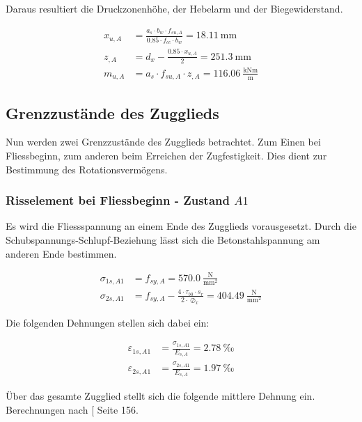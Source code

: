 \documentclass[
  11pt,
  letterpaper,
]{scrreprt}
\begin{document}
Daraus resultiert die Druckzonenhöhe, der Hebelarm und der
Biegewiderstand.

\[
\begin{aligned}
x_{u , A}& = \frac{a_{s} \cdot b_{w} \cdot f_{su , A}}{0.85 \cdot f_{cc} \cdot b_{w}} = 18.11 \ \mathrm{mm} \\ 
z_{, A}& = d_{x} - \frac{0.85 \cdot x_{u , A}}{2} = 251.3 \ \mathrm{mm} \\ 
m_{u , A}& = a_{s} \cdot f_{su , A} \cdot z_{, A} = 116.06 \ \frac{\mathrm{kNm}}{\mathrm{m}} \end{aligned}
\]

\subsection{Grenzzustände des
Zugglieds}\label{grenzzustuxe4nde-des-zugglieds}

Nun werden zwei Grenzzustände des Zugglieds betrachtet. Zum Einen bei
Fliessbeginn, zum anderen beim Erreichen der Zugfestigkeit. Dies dient
zur Bestimmung des Rotationsvermögens.

\subsubsection{\texorpdfstring{Risselement bei Fliessbeginn - Zustand
\(A1\)}{Risselement bei Fliessbeginn - Zustand A1}}\label{risselement-bei-fliessbeginn---zustand-a1}

Es wird die Fliessspannung an einem Ende des Zugglieds vorausgesetzt.
Durch die Schubspannungs-Schlupf-Beziehung lässt sich die
Betonstahlspannung am anderen Ende bestimmen.

\[
\begin{aligned}
\sigma_{1 s , A1}& = f_{sy , A} = 570.0 \ \frac{\mathrm{N}}{\mathrm{mm}^{2}} \\ 
\sigma_{2 s , A1}& = f_{sy , A} - \frac{4 \cdot \tau_{b0} \cdot s_{r}}{2 \cdot \oslash_{x}} = 404.49 \ \frac{\mathrm{N}}{\mathrm{mm}^{2}} \end{aligned}
\]

Die folgenden Dehnungen stellen sich dabei ein:

\[
\begin{aligned}
\varepsilon_{1 s , A1}& = \frac{\sigma_{1 s , A1}}{E_{s , A}} = 2.78 \ \mathrm{‰} \\ 
\varepsilon_{2 s , A1}& = \frac{\sigma_{2 s , A1}}{E_{s , A}} = 1.97 \ \mathrm{‰} \end{aligned}
\]

Über das gesamte Zugglied stellt sich die folgende mittlere Dehnung ein.
Berechnungen nach {[}\citeproc{ref-marti_tragverhalten_1999}{6}{]} Seite
156.
\end{document}
